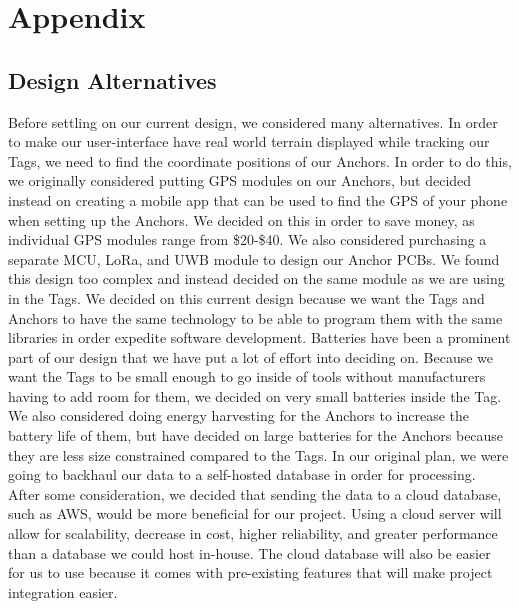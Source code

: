 \documentclass[conference]{IEEEtran}
\begin{document}
\section*{Appendix}
\setcounter{subsection}{0}
\subsection{Design Alternatives}
Before settling on our current design, we considered many alternatives. 
In order to make our user-interface have real world terrain displayed 
while tracking our Tags, we need to find the coordinate positions of our 
Anchors. In order to do this, we originally considered putting GPS 
modules on our Anchors, but decided instead on creating a mobile app 
that can be used to find the GPS of your phone when setting up the 
Anchors. We decided on this in order to save money, as individual GPS 
modules range from \$20-\$40. We also considered purchasing a separate 
MCU, LoRa, and UWB module to design our Anchor PCBs. We found this 
design too complex and instead decided on the same module as we are 
using in the Tags. We decided on this current design because we want 
the Tags and Anchors to have the same technology to be able to program 
them with the same libraries in order expedite software development. 
Batteries have been a prominent part of our design that we have put a 
lot of effort into deciding on. Because we want the Tags to be small 
enough to go inside of tools without manufacturers having to add room 
for them, we decided on very small batteries inside the Tag. We also 
considered doing energy harvesting for the Anchors to increase the 
battery life of them, but have decided on large batteries for the 
Anchors because they are less size constrained compared to the Tags. 
In our original plan, we were going to backhaul our data to a 
self-hosted database in order for processing. After some consideration, 
we decided that sending the data to a cloud database, such as AWS, 
would be more beneficial for our project. Using a cloud server will 
allow for scalability, decrease in cost, higher reliability, and 
greater performance than a database we could host in-house. The cloud 
database will also be easier for us to use because it comes with 
pre-existing features that will make project integration easier.
\end{document}
